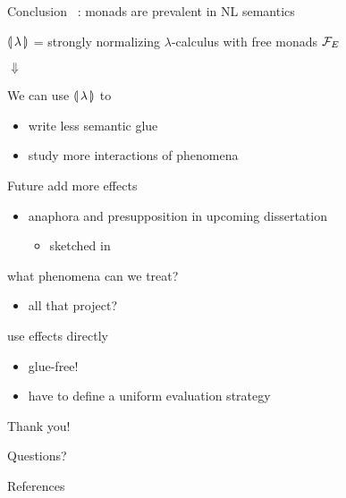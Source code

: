 \documentclass{beamer}
\begin{document}
\begin{frame}{Conclusion}
  \vfill
  \cite{shan2002monads}\ : monads are prevalent in NL semantics

  ${\llparenthesis \, \lambda \, \rrparenthesis}$ = strongly normalizing $\lambda$-calculus with free monads
  $\mathcal{F}_E$
 
  \vfill
  \pause
  \centerline{$\Downarrow$}
  \vfill

  We can use ${\llparenthesis \, \lambda \, \rrparenthesis}$ to
  \begin{itemize}
    \item write less semantic glue
    \item study more interactions of phenomena
  \end{itemize}
  \vfill
\end{frame}


\begin{frame}{Future}
  add more effects
  \begin{itemize}
  \item anaphora and presupposition in upcoming dissertation
    \begin{itemize}
    \item sketched in \cite{marsik2014algebraic}
    \end{itemize}
  \end{itemize}

  \vfill
  what phenomena can we treat?
  \begin{itemize}
  \item all that project?
  \end{itemize}
  
  \vfill
  use effects directly
  \begin{itemize}
  \item glue-free!
  \item have to define a uniform evaluation strategy
  \end{itemize}
\end{frame}


\begin{frame}[standout]
  Thank you!

  Questions?
\end{frame}


\appendix

\begin{frame}[allowframebreaks]{References}
  
  
\end{frame}
\end{document}
